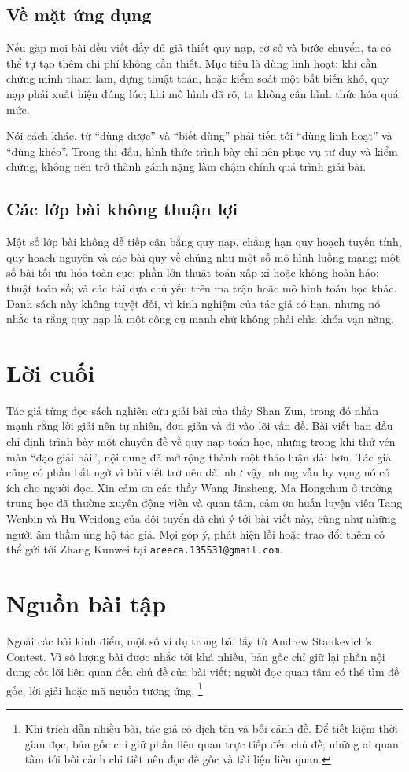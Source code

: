 \documentclass[11pt]{article}
\begin{document}
\subsection{Về mặt ứng dụng}

Nếu gặp mọi bài đều viết đầy đủ giả thiết quy nạp, cơ sở và bước chuyển, ta
có thể tự tạo thêm chi phí không cần thiết. Mục tiêu là dùng linh hoạt: khi
cần chứng minh tham lam, dựng thuật toán, hoặc kiểm soát một bất biến khó,
quy nạp phải xuất hiện đúng lúc; khi mô hình đã rõ, ta không cần hình thức hóa
quá mức.

Nói cách khác, từ ``dùng được'' và ``biết dùng'' phải tiến tới ``dùng linh
hoạt'' và ``dùng khéo''. Trong thi đấu, hình thức trình bày chỉ nên phục vụ
tư duy và kiểm chứng, không nên trở thành gánh nặng làm chậm chính quá trình
giải bài.

\subsection{Các lớp bài không thuận lợi}

Một số lớp bài không dễ tiếp cận bằng quy nạp, chẳng hạn quy hoạch tuyến tính,
quy hoạch nguyên và các bài quy về chúng như một số mô hình luồng mạng; một
số bài tối ưu hóa toàn cục; phần lớn thuật toán xấp xỉ hoặc không hoàn hảo;
thuật toán số; và các bài dựa chủ yếu trên ma trận hoặc mô hình toán học khác.
Danh sách này không tuyệt đối, vì kinh nghiệm của tác giả có hạn, nhưng nó
nhắc ta rằng quy nạp là một công cụ mạnh chứ không phải chìa khóa vạn năng.

\section{Lời cuối}

Tác giả từng đọc sách nghiên cứu giải bài của thầy Shan Zun, trong đó nhấn
mạnh rằng lời giải nên tự nhiên, đơn giản và đi vào lõi vấn đề. Bài viết ban
đầu chỉ định trình bày một chuyên đề về quy nạp toán học, nhưng trong khi thử
vén màn ``đạo giải bài'', nội dung đã mở rộng thành một thảo luận dài hơn.
Tác giả cũng có phần bất ngờ vì bài viết trở nên dài như vậy, nhưng vẫn hy
vọng nó có ích cho người đọc. Xin cảm ơn các thầy Wang Jinsheng, Ma Hongchun
ở trường trung học đã thường xuyên động viên và quan tâm, cảm ơn huấn luyện
viên Tang Wenbin và Hu Weidong của đội tuyển đã chú ý tới bài viết này, cũng
như những người âm thầm ủng hộ tác giả. Mọi góp ý, phát hiện lỗi hoặc trao
đổi thêm có thể gửi tới Zhang Kunwei tại
\texttt{aceeca.135531@gmail.com}.

\section{Nguồn bài tập}

Ngoài các bài kinh điển, một số ví dụ trong bài lấy từ Andrew Stankevich's
Contest. Vì số lượng bài được nhắc tới khá nhiều, bản gốc chỉ giữ lại phần
nội dung cốt lõi liên quan đến chủ đề của bài viết; người đọc quan tâm có thể
tìm đề gốc, lời giải hoặc mã nguồn tương ứng.
\footnote{Khi trích dẫn nhiều bài, tác giả có dịch tên và bối cảnh đề. Để
tiết kiệm thời gian đọc, bản gốc chỉ giữ phần liên quan trực tiếp đến chủ đề;
những ai quan tâm tới bối cảnh chi tiết nên đọc đề gốc và tài liệu liên quan.}
\end{document}
